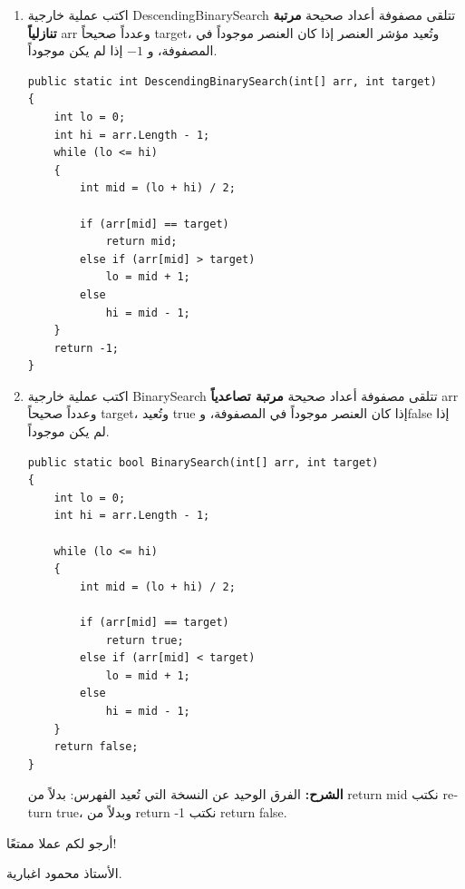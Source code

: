 \documentclass[14pt]{extarticle}
\begin{document}
\begin{enumerate}[itemsep=2em]
\item
اكتب عملية خارجية \textenglish{DescendingBinarySearch} تتلقى مصفوفة أعداد صحيحة \textbf{مرتبة تنازلياً} \textenglish{arr} وعدداً صحيحاً \textenglish{target}، وتُعيد مؤشر العنصر إذا كان العنصر موجوداً في المصفوفة، و $-1$ إذا لم يكن موجوداً.
\ifwithsols
\begin{boxSolution}
\begin{english}
\begin{boxCode}
\begin{verbatim}
public static int DescendingBinarySearch(int[] arr, int target)
{
    int lo = 0;
    int hi = arr.Length - 1;
    while (lo <= hi)
    {
        int mid = (lo + hi) / 2;

        if (arr[mid] == target)
            return mid;
        else if (arr[mid] > target)
            lo = mid + 1;
        else
            hi = mid - 1;
    }
    return -1;
}
\end{verbatim}
\end{boxCode}
\end{english}
\end{boxSolution}
\clearpage
\fi

\item
اكتب عملية خارجية \textenglish{BinarySearch} تتلقى مصفوفة أعداد صحيحة \textbf{مرتبة تصاعدياً} \textenglish{arr} وعدداً صحيحاً \textenglish{target}، وتُعيد \textenglish{true} إذا كان العنصر موجوداً في المصفوفة، و\textenglish{false} إذا لم يكن موجوداً.

\ifwithsols
\begin{boxSolution}
\begin{english}
\begin{boxCode}
\begin{verbatim}
public static bool BinarySearch(int[] arr, int target)
{
    int lo = 0;
    int hi = arr.Length - 1;

    while (lo <= hi)
    {
        int mid = (lo + hi) / 2;

        if (arr[mid] == target)
            return true;
        else if (arr[mid] < target)
            lo = mid + 1;
        else
            hi = mid - 1;
    }
    return false;
}
\end{verbatim}
\end{boxCode}
\end{english}
\textbf{الشرح:} الفرق الوحيد عن النسخة التي تُعيد الفهرس: بدلاً من \textenglish{return mid} نكتب \textenglish{return true}، وبدلاً من \textenglish{return -1} نكتب \textenglish{return false}.
\end{boxSolution}
\fi

\end{enumerate}

\vspace{1cm}
\begin{flushleft}
أرجو لكم عملا ممتعًا!

الأستاذ محمود اغبارية.
\end{flushleft}
\end{document}

